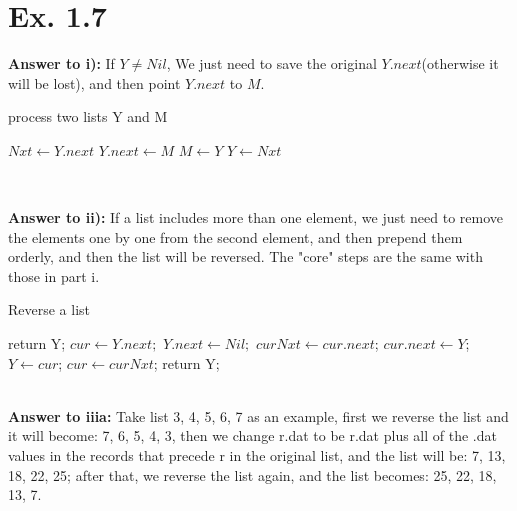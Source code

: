 \documentclass[a4paper,11pt]{article}
\theoremstyle{mytheor}
\begin{document}
\vspace{1.2in}

\section*{Ex. 1.7}
\noindent\textbf{Answer to i):} If $Y \neq Nil$, We just need to save the original  $Y.next$(otherwise it will be lost), and then point $Y.next$ to $M$.

\begin{algorithm}[H]
\caption{process two lists Y and M}
\begin{algorithmic}[1]
    \State $Nxt \gets Y.next$
    \State $Y.next \gets M$
    \State $M \gets Y$ 
    \State $Y \gets Nxt$ 
  \EndIf
\EndProcedure
\end{algorithmic}
\end{algorithm}

~\\

\vspace{1.2in}

\noindent\textbf{Answer to ii):} 
If a list includes more than one element, we just need to remove the elements one by one from the second element, and then prepend them orderly, and then the list will be reversed. The "core" steps are the same with those in part i.
\begin{algorithm}[H]
\caption{Reverse a list}
\begin{algorithmic}[1]
    \State return Y;
  \Else
    \State $cur \gets Y.next;$
    \State $Y.next \gets Nil;$ 
      \State $curNxt \gets cur.next$;
      \State $cur.next \gets Y$;
      \State $Y \gets cur$;
      \State $cur \gets curNxt$;
    \EndWhile
  \EndIf
  \State return Y;
\EndProcedure
\end{algorithmic}
\end{algorithm}

\vspace{1.2in}
~\\

\noindent\textbf{Answer to iiia:} Take list 3, 4, 5, 6, 7 as an example, first we reverse the list and it will become: 7, 6, 5, 4, 3, then we change r.dat to be r.dat plus all of the .dat values in the records that precede r in the original list, and the list will be: 7, 13, 18, 22, 25; after that, we reverse the list again, and the list becomes: 25, 22, 18, 13, 7.
\end{document}
